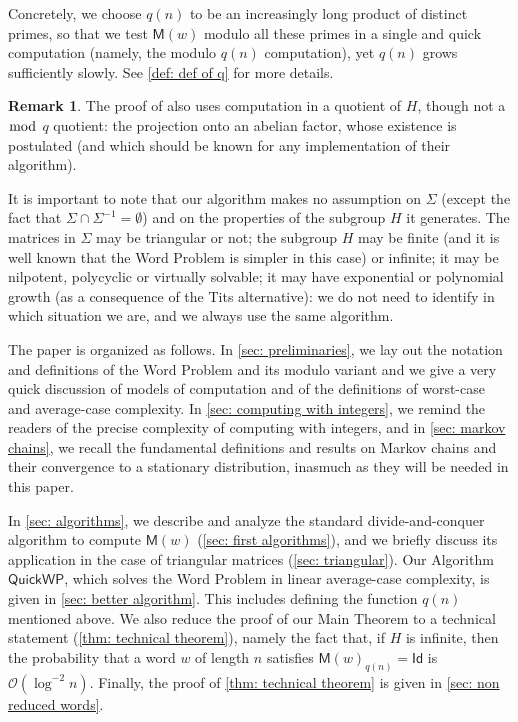 \documentclass{article}
\def\Id{\textsf{Id}}
\def\O{\mathcal{O}}
\def\S{\textsf{QuickWP}}
\def\mat{\textsf{M}}
\def\inv{^{-1}}
\theoremstyle{plain}
\theoremstyle{definition}
\newtheorem{remark}[theorem]{Remark}
\begin{document}
Concretely, we choose $q(n)$ to be an increasingly long product of distinct primes, so that we test $\mat(w)$ modulo all these primes in a single and quick computation (namely, the modulo $q(n)$ computation), yet $q(n)$ grows sufficiently slowly. See \cref{def: def of q} for more details.


\begin{remark}\label{rem: compare quotienting proofs}
    The proof of \cite[Theorem 3]{2025:OlshShp} also uses computation in a quotient of $H$, though not a $\bmod$ $q$ quotient: the projection onto an abelian factor, whose existence is postulated (and which should be known for any implementation of their algorithm).
\end{remark}

It is important to note that our algorithm makes no assumption on $\Sigma$ (except the fact that $\Sigma \cap \Sigma\inv = \emptyset$) and on the properties of the subgroup $H$ it generates. The matrices in $\Sigma$ may be triangular or not; the subgroup $H$ may be finite (and it is well known that the Word Problem is simpler in this case) or infinite; it may be nilpotent, polycyclic or virtually solvable; it may have exponential or polynomial growth (as a consequence of the Tits alternative): we do not need to identify in which situation we are, and we always use the same algorithm.

The paper is organized as follows. In \cref{sec: preliminaries}, we lay out the notation and definitions of the Word Problem and its modulo variant and we give a very quick discussion of models of computation and of the definitions of worst-case and average-case complexity. In \cref{sec: computing with integers}, we remind the readers of the precise complexity of computing with integers, and in \cref{sec: markov chains}, we recall the fundamental definitions and results on Markov chains and their convergence to a stationary distribution, inasmuch as they will be needed in this paper.

In \cref{sec: algorithms}, we describe and analyze the standard divide-and-conquer algorithm to compute $\mat(w)$ (\cref{sec: first algorithms}), and we briefly discuss its application in the case of triangular matrices (\cref{sec: triangular}). Our Algorithm $\S$, which solves the Word Problem in linear average-case complexity, is given in \cref{sec: better algorithm}. This includes defining the function $q(n)$ mentioned above. We also reduce the proof of our Main Theorem to a technical statement (\cref{thm: technical theorem}), namely the fact that, if $H$ is infinite, then the probability that a word %
$w$ of length $n$ satisfies $\mat(w)_{q(n)} = \Id$ is $\O(\log^{-2}n)$. Finally, the proof of \cref{thm: technical theorem} is given in \cref{sec: non reduced words}.
\end{document}
